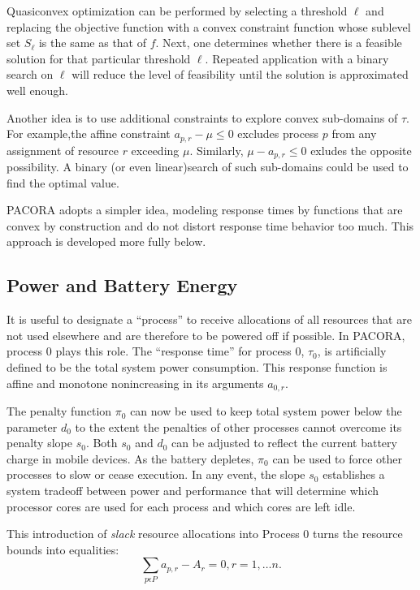 Quasiconvex optimization can be performed by selecting a threshold $\ell$ and replacing the objective function
with a convex constraint function whose sublevel set $S_\ell$ is the same as that of $f$.
Next, one determines whether there is a feasible solution for that particular threshold $\ell$.
Repeated application with a binary search on $\ell$ will reduce the level of feasibility
until the solution is approximated well enough.

Another idea is to use additional constraints to explore convex sub-domains of $\tau$.
For example,the affine constraint $a_{p,r} - \mu \leq 0$ excludes process $p$ from any assignment of resource $r$ exceeding $\mu$.  Similarly, $\mu - a_{p,r} \leq 0$ exludes the opposite possibility.
A binary (or even linear)search of such sub-domains could be used to find the optimal value.

PACORA adopts a simpler idea, modeling response times by functions that are convex by construction
and do not distort response time behavior too much.  This approach is developed more fully below.

\subsection*{Power and Battery Energy}

It is useful to designate a ``process'' to receive allocations of all resources
that are not used elsewhere and are therefore to be powered off if possible.
In PACORA, process 0 plays this role.
The ``response time'' for process 0, $\tau_0$,
is artificially defined to be the total system power consumption.
This response function is affine and monotone nonincreasing in its arguments $a_{0,r}$.

The penalty function $\pi_0$ can now be used to keep total system power below the parameter $d_0$
to the extent the penalties of other processes cannot overcome its penalty slope $s_0$.
Both $s_0$ and $d_0$ can be adjusted to reflect the current battery charge in mobile devices.
As the battery depletes, $\pi_0$ can be used to force other processes to slow or cease execution.
In any event, the slope $s_0$ establishes a system tradeoff between power and performance that
will determine which processor cores are used for each process and which cores are left idle.

This introduction of \emph{slack} resource allocations into Process 0 turns the resource bounds into equalities:
\begin{displaymath}
\sum_{p\epsilon P} a_{p,r} - A_r = 0, r = 1,\dots n.
\end{displaymath}

